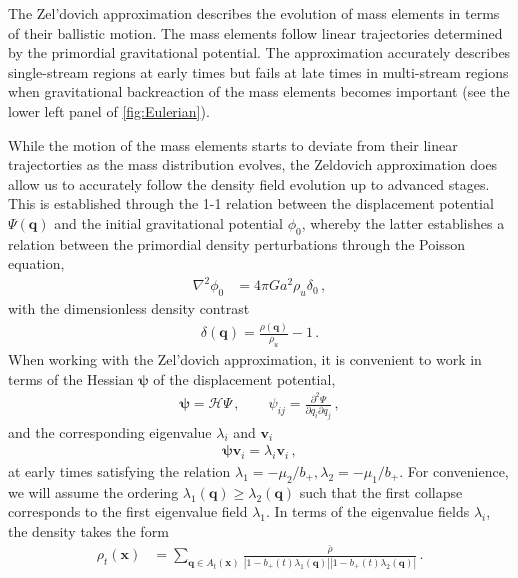 \documentclass[a4paper, 11pt]{article}
\begin{document}
The Zel'dovich approximation describes the evolution of mass elements in terms of their ballistic motion. The mass elements follow linear trajectories determined by the primordial gravitational potential. The approximation accurately describes single-stream regions at early times but fails at late times in multi-stream regions when gravitational backreaction of the mass elements becomes important (see the lower left panel of \ref{fig:Eulerian}).

\bigskip
While the motion of the mass elements starts to deviate from their linear trajectorties as the mass distribution evolves, the Zeldovich approximation does allow us to accurately follow the density field evolution up to advanced stages. This is established through the 1-1 relation between the displacement potential $\Psi(\bm{q})$ and the initial gravitational potential $\phi_0$, whereby the latter establishes a relation between the primordial density perturbations through the Poisson equation,
\begin{align}
\nabla ^2 \phi_0 &= 4 \pi G a^2 \rho_u \delta_0\,,%
\end{align}
with the dimensionless density contrast
\begin{align}
\delta(\bm{q}) = \frac{\rho(\bm{q})}{\rho_u} -1\,.
\end{align}
When working with the Zel'dovich approximation, it is convenient to work in terms of the Hessian $\bm{\psi}$ of the displacement potential,
\begin{align}
  \bm{\psi}=\mathcal{H}\Psi\,,\qquad \psi_{ij}=\frac{\partial^2 \Psi}{\partial q_i \partial q_j}\,,
  \label{eq:deformatiozeld}
\end{align}
and the corresponding eigenvalue $\lambda_i$ and $\bm{v}_i$
\begin{align}
\bm{\psi}\bm{v}_i = \lambda_i \bm{v}_i\,,
\end{align} 
at early times satisfying the relation $\lambda_1 =-\mu_2/b_+,\lambda_2 =-\mu_1/b_+$. For convenience, we will assume the ordering $\lambda_1(\bm{q}) \geq \lambda_2(\bm{q})$ such that the first collapse corresponds to the first eigenvalue field $\lambda_1$. In terms of the eigenvalue fields $\lambda_i$, the density takes the form 
\begin{align}
\rho_t(\bm{x})
&= \sum_{\bm{q} \in A_t(\bm{x})} \frac{\bar{\rho}}{|1-b_+(t) \lambda_1(\bm{q})||1-b_+(t) \lambda_2(\bm{q})|}\,.
\label{eq:denszeld}
\end{align}
\end{document}
